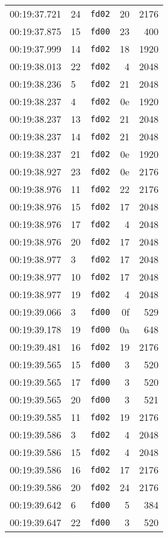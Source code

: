 \documentclass{article}
\begin{document}
\begin{longtable}{lllrr}
00:19:37.721 & 24 & \texttt{fd02} & 20 & 2176 \\
00:19:37.875 & 15 & \texttt{fd00} & 23 & 400 \\
00:19:37.999 & 14 & \texttt{fd02} & 18 & 1920 \\
00:19:38.013 & 22 & \texttt{fd02} & 4 & 2048 \\
00:19:38.236 & 5 & \texttt{fd02} & 21 & 2048 \\
00:19:38.237 & 4 & \texttt{fd02} & 0e & 1920 \\
00:19:38.237 & 13 & \texttt{fd02} & 21 & 2048 \\
00:19:38.237 & 14 & \texttt{fd02} & 21 & 2048 \\
00:19:38.237 & 21 & \texttt{fd02} & 0e & 1920 \\
00:19:38.927 & 23 & \texttt{fd02} & 0e & 2176 \\
00:19:38.976 & 11 & \texttt{fd02} & 22 & 2176 \\
00:19:38.976 & 15 & \texttt{fd02} & 17 & 2048 \\
00:19:38.976 & 17 & \texttt{fd02} & 4 & 2048 \\
00:19:38.976 & 20 & \texttt{fd02} & 17 & 2048 \\
00:19:38.977 & 3 & \texttt{fd02} & 17 & 2048 \\
00:19:38.977 & 10 & \texttt{fd02} & 17 & 2048 \\
00:19:38.977 & 19 & \texttt{fd02} & 4 & 2048 \\
00:19:39.066 & 3 & \texttt{fd00} & 0f & 529 \\
00:19:39.178 & 19 & \texttt{fd00} & 0a & 648 \\
00:19:39.481 & 16 & \texttt{fd02} & 19 & 2176 \\
00:19:39.565 & 15 & \texttt{fd00} & 3 & 520 \\
00:19:39.565 & 17 & \texttt{fd00} & 3 & 520 \\
00:19:39.565 & 20 & \texttt{fd00} & 3 & 521 \\
00:19:39.585 & 11 & \texttt{fd02} & 19 & 2176 \\
00:19:39.586 & 3 & \texttt{fd02} & 4 & 2048 \\
00:19:39.586 & 15 & \texttt{fd02} & 4 & 2048 \\
00:19:39.586 & 16 & \texttt{fd02} & 17 & 2176 \\
00:19:39.586 & 20 & \texttt{fd02} & 24 & 2176 \\
00:19:39.642 & 6 & \texttt{fd00} & 5 & 384 \\
00:19:39.647 & 22 & \texttt{fd00} & 3 & 520 \\

\end{longtable}
\end{document}
